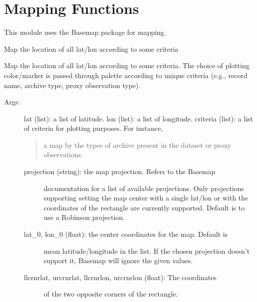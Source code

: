 \documentclass[letterpaper,10pt,english]{sphinxmanual}
\begin{document}
\chapter{Mapping Functions}
\label{\detokenize{Map:mapping-functions}}\label{\detokenize{Map::doc}}
This module uses the Basemap package for mapping.

\begin{fulllineitems}
\label{\detokenize{Map:pyleoclim.Map.mapAll}}
Map the location of all lat/lon according to some criteria

Map the location of all lat/lon according to some criteria. The choice of 
plotting color/marker is passed through palette according to unique 
criteria (e.g., record name, archive type, proxy observation type).
\begin{description}
\item[{Args:}] \leavevmode
lat (list): a list of latitude.
lon (list): a list of longitude.
criteria (list): a list of criteria for plotting purposes. For instance,
\begin{quote}

a map by the types of archive present in the dataset or proxy
observations.
\end{quote}
\begin{description}
\item[{projection (string): the map projection. Refers to the Basemap}] \leavevmode
documentation for a list of available projections. Only projections
supporting setting the map center with a single lat/lon or with
the coordinates of the rectangle are currently supported. 
Default is to use a Robinson projection.

\item[{lat\_0, lon\_0 (float): the center coordinates for the map. Default is}] \leavevmode
mean latitude/longitude in the list. 
If the chosen projection doesn’t support it, Basemap will
ignore the given values.

\item[{llcrnrlat, urcrnrlat, llcrnrlon, urcrnrlon (float): The coordinates}] \leavevmode
of the two opposite corners of the rectangle.


\end{description}
\end{description}
\end{fulllineitems}
\end{document}
